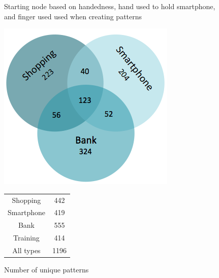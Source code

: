 {{\begin{figure}[H]
      \caption{Starting node based on handedness, hand used to hold smartphone, and finger used used when creating patterns}
    \end{figure}

    \clearpage

    \begin{figure}[H]
      \centering
      \begin{minipage}[b]{0.40\linewidth}
      \centering
        \includegraphics[scale=0.4]{pics/analysis/uniquePatternsVenn.png}
      \end{minipage}%
      \begin{minipage}[b]{0.30\linewidth}
        \centering
        \begin{tabular}{ c | c }
          \hline
          Shopping &  442 \\
          Smartphone & 419 \\
          Bank & 555 \\
          Training & 414 \\ \hline \hline
          All types & 1196 \\ \hline
        \end{tabular}
        \vspace{1cm}
      \end{minipage}
      \caption{Number of unique patterns}
      \label{fig:test}
    \end{figure}

}}
